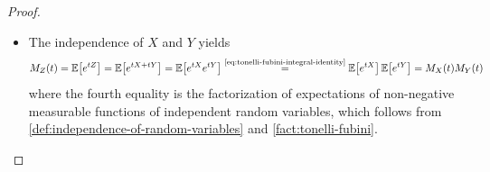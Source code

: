 \begin{proof}
\begin{itemize}
\item[\ref{item:mgf-properties-sum}]
The independence of $X$ and $Y$ yields
\[
M_Z(t)
=
\operatorname{\mathbb{E}}\bigl[e^{tZ}\bigr]
=
\operatorname{\mathbb{E}}\bigl[e^{tX+tY}\bigr]
=
\operatorname{\mathbb{E}}\bigl[e^{tX}e^{tY}\bigr]
\overset{\text{\eqref{eq:tonelli-fubini-integral-identity}}}{=}
\operatorname{\mathbb{E}}\bigl[e^{tX}\bigr]\operatorname{\mathbb{E}}\bigl[e^{tY}\bigr]
=
M_X(t)M_Y(t)
\]
where the fourth equality is the factorization of expectations of non-negative measurable functions of independent random variables, which follows from \autoref{def:independence-of-random-variables} and \autoref{fact:tonelli-fubini}.



\end{itemize}
\end{proof}
